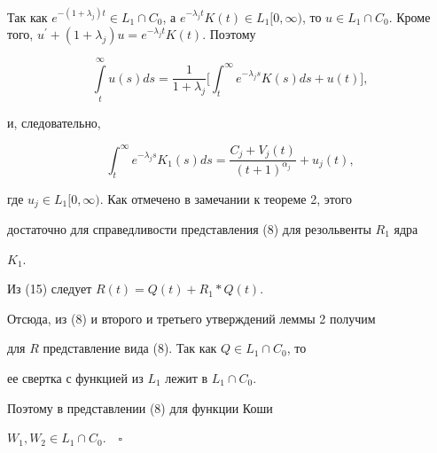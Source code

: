 Так как $e^{-(1+\lambda_j)t} \in L_1 \cap C_0$, а $e^{-\lambda_j t} K(t)


\in L_1 [0,\infty)$, то $u \in L_1 \cap C_0$. Кроме того, $u ^\prime +


(1+\lambda_j)u=e^{-\lambda_j t} K(t)$. Поэтому


$$


\int \limits_t^\infty u(s) ds = \frac{1}{1+\lambda_j} \bigg [ \int_


t^\infty e^{-\lambda_j s}K(s) ds + u(t) \bigg ],


$$


и, следовательно,


$$


\int_t^\infty e^{-\lambda_j s}K_1(s) ds= \frac{C_j+V_j(t)}{


(t+1)^{\alpha_j}} + u_j(t),


$$


где $u_j \in L_1 [0,\infty)$. Как отмечено в замечании к теореме 2, этого


достаточно для справедливости представления (8) для резольвенты $R_1$ ядра


$K_1$.





Из (15) следует $R(t)=Q(t)+R_1 \ast Q(t)$.


Отсюда, из (8) и второго и третьего утверждений леммы 2 получим


для $R$ представление вида (8). Так как $Q\in L_1\cap C_0$, то


ее свертка с функцией из $L_1$ лежит в $ L_1 \cap C_0$.


Поэтому в представлении (8) для функции Коши


$W_1,W_2 \in L_1 \cap C_0$.$\quad\square$


\vspace{1cm}





